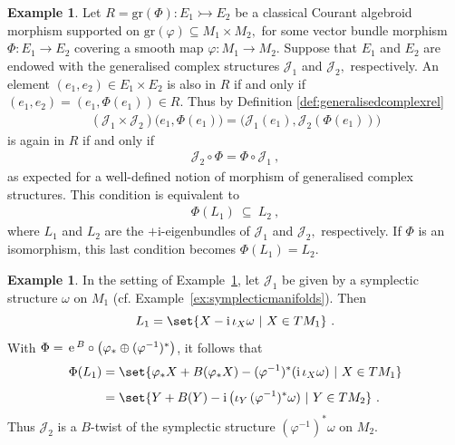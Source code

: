 \documentclass[a4paper, reqno, 11pt]{amsart}
\numberwithin{equation}{section}
\theoremstyle{definition}
\newtheorem{example}[equation]{Example}
\newcommand{\e}{\mathrm{e}}
\newcommand{\ii}{\mathrm{i}}
\def\e{{\,\rm e}\,}
\newcommand{\cJ}{{\mathcal J}}
\newcommand{\gr}{\text{gr}}
\theoremstyle{remark}
\begin{document}
\begin{example} \label{ex:gencomplexrelgraph}
Let $R= \gr(\Phi) \colon E_1 \rightarrowtail E_2$ be a classical Courant algebroid morphism supported on $\gr(\varphi) \subseteq M_1 \times M_2,$ for some vector bundle morphism $\Phi \colon E_1 \to E_2$ covering a smooth map $\varphi \colon M_1 \to M_2.$ Suppose that $E_1$ and $E_2$ are endowed with the generalised complex structures $\cJ_1$ and $\cJ_2,$ respectively. An element $(e_1, e_2) \in E_1 \times E_2$ is also in $R$ if and only if 
$(e_1, e_2 ) = (e_1, \Phi(e_1)) \in R$. Thus by Definition \ref{def:generalisedcomplexrel}
\begin{align}
    (\cJ_1\times\cJ_2)\big(e_1 , \Phi(e_1)\big) = \big(\cJ_1 (e_1), \cJ_2(\Phi(e_1))\big)
\end{align}
is again in $R$ if and only if
\begin{align}
    \cJ_2 \circ \Phi = \Phi \circ \cJ_1 \ ,
\end{align}
as expected for a well-defined notion of morphism of generalised complex structures. This condition is equivalent to 
\begin{align}
\Phi(L_1) \ \subseteq \ L_2 \ ,
\end{align}
where $L_1$ and $L_2$ are the $+\ii$-eigenbundles of $\cJ_1$ and $\cJ_2,$ respectively. If $\Phi$ is an isomorphism, this last condition becomes $\Phi(L_1)=L_2.$
\end{example}

\begin{example}\label{eg:symplectictypeiso}
    In the setting of Example~\ref{ex:gencomplexrelgraph}, let $\cJ_1$ be given by a symplectic structure $\omega$ on $M_1$ (cf. Example~\ref{ex:symplecticmanifolds}). Then $$L_1 = \set{X - \ii\, \iota_X \omega\ \vert\ X \in TM_1} \ . $$ With $\Phi = \e^B \circ \big( \varphi_*\oplus(\varphi^{-1})^*\big)$, it follows that
    \begin{equation}
    \begin{aligned}
        \Phi(L_1) &= \set{\varphi_* X + B( \varphi_* X) - (\varphi^{-1})^*(\ii\, \iota_X \omega)\ \vert\ X \in TM_1}\\[4pt]
        &= \set{Y + B(Y) - \ii\,\big(\iota_Y\, (\varphi^{-1})^* \omega) \ \vert\ Y\in TM_2} \ .
    \end{aligned}
    \end{equation}
    Thus $\cJ_2$ is a $B$-twist of the symplectic structure $(\varphi^{-1})^*\omega$ on $M_2$.
\end{example}
\end{document}
